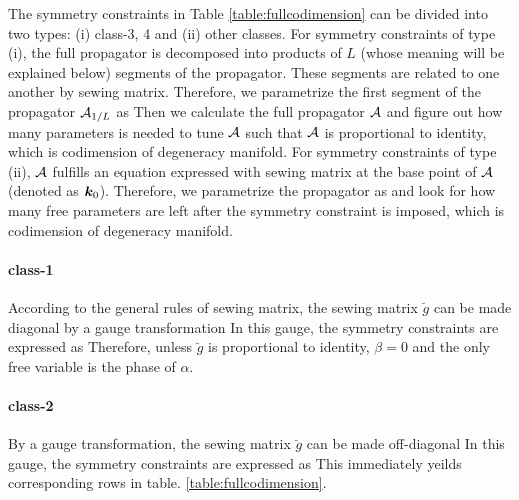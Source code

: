 \documentclass[aps, prb, showpacs, twocolumn, notitlepage, superscriptaddress]{revtex4-1}
\begin{document}
The symmetry constraints in Table \ref{table:fullcodimension} can be divided into two types: (i) class-3, 4 and (ii) other classes. For symmetry constraints of type (i), the full propagator is decomposed into products of $L$ (whose meaning will be explained below) segments of the propagator. These segments are related to one another by sewing matrix. Therefore, we parametrize the first segment of the propagator ${\cal A}_{1/L}$ as
Then we calculate the full propagator ${\cal A}$ and figure out how many parameters is needed to tune ${\cal A}$ such that ${\cal A}$ is proportional to identity, which is codimension of degeneracy manifold. For symmetry constraints of type (ii), ${\cal A}$ fulfills an equation expressed with sewing matrix at the base point of ${\cal A}$ (denoted as $\boldsymbol{k}_0$). Therefore, we parametrize the propagator as
and look for how many free parameters are left after the symmetry constraint is imposed, which is codimension of degeneracy manifold.


\paragraph*{class-1} According to the general rules of sewing matrix, the sewing matrix $\breve{g}$ can be made diagonal by a gauge transformation
In this gauge, the symmetry constraints are expressed as 
Therefore, unless $\breve{g}$ is proportional to identity, $\beta=0$ and the only free variable is the phase of $\alpha$.

\paragraph*{class-2}
By a gauge transformation, the sewing matrix $\breve{g}$ can be made off-diagonal
In this gauge, the symmetry constraints are expressed as
This immediately yeilds corresponding rows in table. \ref{table:fullcodimension}.
\end{document}
